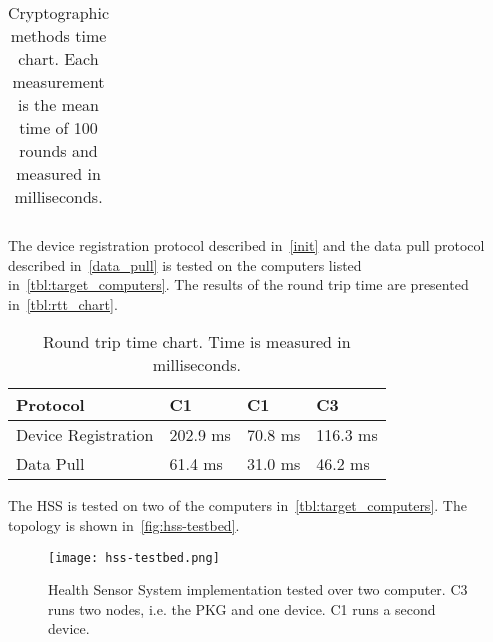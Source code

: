 \begin{table}[h]
\begin{tabular}[c]{lllll}
  \end{tabular}
  \caption[Time chart of cryptographic computations]{Cryptographic methods time chart. Each measurement is the mean time of 100 rounds and measured in milliseconds. }
  \label{tbl:time_chart}
\end{table}


The device registration protocol described in~\autoref{init} and the data pull protocol described in~\autoref{data_pull} is tested on the computers listed in~\autoref{tbl:target_computers}.
The results of the round trip time are presented in~\autoref{tbl:rtt_chart}.
\begin{table}[h]
  \begin{tabular}[c]{p{}p{}p{}p{}}
  Protocol                                & C1            & C1            & C3            \\ \hline
  Device Registration                     & 202.9 ms      & 70.8 ms       & 116.3 ms      \\ %
  Data Pull                               & 61.4 ms       & 31.0 ms       & 46.2 ms       \\ %
  \end{tabular}
  \caption[Round trip time of protocols]{Round trip time chart. Time is measured in milliseconds.}
  \label{tbl:rtt_chart}
\end{table}

The \gls{HSS} is tested on two of the computers in~\autoref{tbl:target_computers}.
The topology is shown in~\autoref{fig:hss-testbed}.
\begin{figure}[ht]
  \centering
  \texttt{[image: hss-testbed.png]}
  \caption[HSS testing - computer topology]{Health Sensor System implementation tested over two computer. 
  C3 runs two nodes, i.e. the PKG and one device. 
  C1 runs a second device.}
  \label{fig:hss-testbed}
\end{figure}

